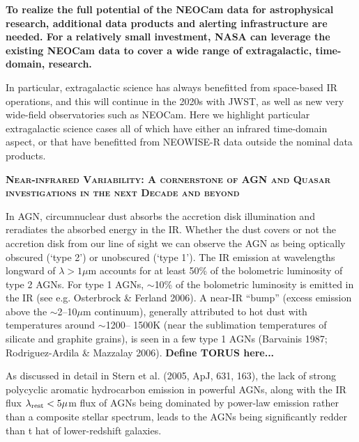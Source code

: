 \documentclass[12pt]{article}
\begin{document}
\smallskip
\smallskip
\noindent
{\bf To realize the full potential of the NEOCam data for
astrophysical research, additional data products and alerting
infrastructure are needed. For a relatively small investment, NASA can
leverage the existing NEOCam data to cover a wide range of
extragalactic, time-domain, research.}


\smallskip
\smallskip
\noindent
In particular, extragalactic science has always benefitted from
space-based IR operations, and this will continue in the 2020s with
JWST, as well as new very wide-field observatories such as
NEOCam. Here we highlight particular extragalactic science cases all
of which have either an infrared time-domain aspect, or that have
benefitted from NEOWISE-R data outside the nominal data products.


\smallskip
\smallskip
\noindent
{\bfseries \textsc{\textcolor{Cerulean}{
Near-infrared Variability: A cornerstone of AGN and Quasar investigations in the next Decade and beyond
}}}


\smallskip
\smallskip
\noindent
In AGN, circumnuclear dust absorbs the accretion disk illumination and reradiates the absorbed energy in the IR. 
Whether the dust covers or not the accretion disk from our line of sight we can observe the AGN as being optically obscured (`type 2') or unobscured (`type 1'). The IR emission at wavelengths longward of $\lambda > 1 \mu$m accounts for at least 50\% of the bolometric luminosity of type 2 AGNs. For type 1 AGNs, $\sim$10\% of the bolometric luminosity is emitted in the IR 
(see e.g. Osterbrock \& Ferland 2006). A near-IR ``bump'' (excess emission above the $\sim$2–10$\mu$m continuum), generally attributed to hot dust with temperatures around $\sim$1200– 1500K (near the sublimation temperatures of silicate and graphite grains), is seen in a few type 1 AGNs (Barvainis 1987; Rodriguez-Ardila \& Mazzalay 2006). {\bf Define TORUS here...}

\smallskip
\smallskip
\noindent
As discussed in detail in Stern et al. (2005, ApJ, 631, 163), the lack of strong polycyclic aromatic hydrocarbon emission in powerful AGNs, along with the IR flux $\lambda_{\rm rest} < 5 \mu$m flux of AGNs being dominated by power-law emission rather than a composite stellar spectrum, leads to the  AGNs being significantly redder than t
hat of lower-redshift galaxies. 
\end{document}
